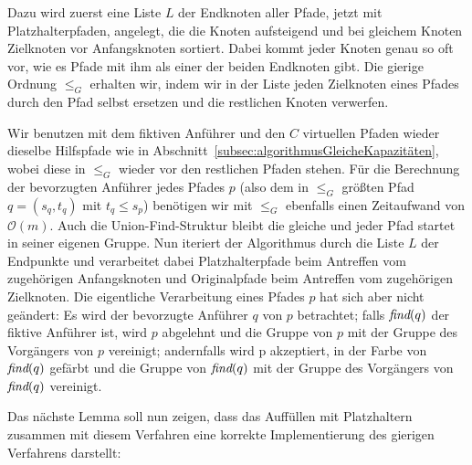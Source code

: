 Dazu wird zuerst eine Liste $L$ der Endknoten aller Pfade, jetzt mit Platzhalterpfaden, angelegt, die die Knoten
aufsteigend und bei gleichem Knoten Zielknoten vor Anfangsknoten sortiert.
Dabei kommt jeder Knoten genau so oft vor, wie es Pfade mit ihm als einer der beiden Endknoten gibt.
Die gierige Ordnung $\leq_{G}$ erhalten wir, indem wir in der Liste jeden Zielknoten eines Pfades durch den Pfad selbst
ersetzen und die restlichen Knoten verwerfen.

Wir benutzen mit dem fiktiven Anführer und den $C$ virtuellen Pfaden wieder dieselbe Hilfspfade wie in
Abschnitt~\ref{subsec:algorithmusGleicheKapazitäten}, wobei diese in $\leq_G$ wieder vor den restlichen Pfaden stehen.
Für die Berechnung der bevorzugten Anführer jedes Pfades $p$ (also dem in $\leq_G$ größten Pfad $q = (s_q, t_q)$ mit
$t_q \leq s_p$) benötigen wir mit $\leq_G$ ebenfalls einen Zeitaufwand von
$\mathcal O(m)$.
Auch die Union-Find-Struktur bleibt die gleiche und jeder Pfad startet in seiner eigenen Gruppe.
Nun iteriert der Algorithmus durch die Liste $L$ der Endpunkte und verarbeitet dabei Platzhalterpfade beim Antreffen vom
zugehörigen Anfangsknoten und Originalpfade beim Antreffen vom zugehörigen Zielknoten.
Die eigentliche Verarbeitung eines Pfades $p$ hat sich aber nicht geändert: Es wird der bevorzugte Anführer $q$ von $p$
betrachtet;
falls $\text{\em find}(q)$ der fiktive Anführer ist, wird $p$ abgelehnt und die Gruppe von $p$ mit der
Gruppe des Vorgängers von $p$ vereinigt;
andernfalls wird p akzeptiert, in der Farbe von $\text{\em find}(q)$
gefärbt und die Gruppe von $\text{\em find}(q)$ mit der Gruppe des Vorgängers von $\text{\em find}(q)$ vereinigt.

Das nächste Lemma soll nun zeigen, dass das Auffüllen mit Platzhaltern zusammen mit diesem Verfahren eine korrekte
Implementierung des gierigen Verfahrens darstellt:

